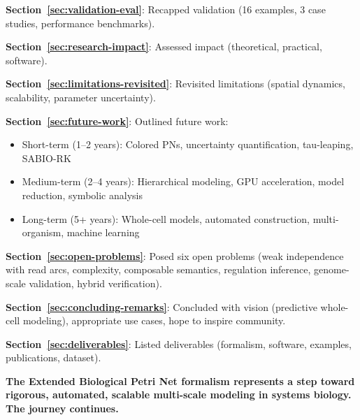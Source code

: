 \textbf{Section~\ref{sec:validation-eval}}: Recapped validation (16 examples, 3 case studies, performance benchmarks).

\textbf{Section~\ref{sec:research-impact}}: Assessed impact (theoretical, practical, software).

\textbf{Section~\ref{sec:limitations-revisited}}: Revisited limitations (spatial dynamics, scalability, parameter uncertainty).

\textbf{Section~\ref{sec:future-work}}: Outlined future work:
\begin{itemize}
    \item Short-term (1--2 years): Colored PNs, uncertainty quantification, tau-leaping, SABIO-RK
    \item Medium-term (2--4 years): Hierarchical modeling, GPU acceleration, model reduction, symbolic analysis
    \item Long-term (5+ years): Whole-cell models, automated construction, multi-organism, machine learning
\end{itemize}

\textbf{Section~\ref{sec:open-problems}}: Posed six open problems (weak independence with read arcs, complexity, composable semantics, regulation inference, genome-scale validation, hybrid verification).

\textbf{Section~\ref{sec:concluding-remarks}}: Concluded with vision (predictive whole-cell modeling), appropriate use cases, hope to inspire community.

\textbf{Section~\ref{sec:deliverables}}: Listed deliverables (formalism, software, examples, publications, dataset).

\vspace{1em}

\textbf{The Extended Biological Petri Net formalism represents a step toward rigorous, automated, scalable multi-scale modeling in systems biology. The journey continues.}
